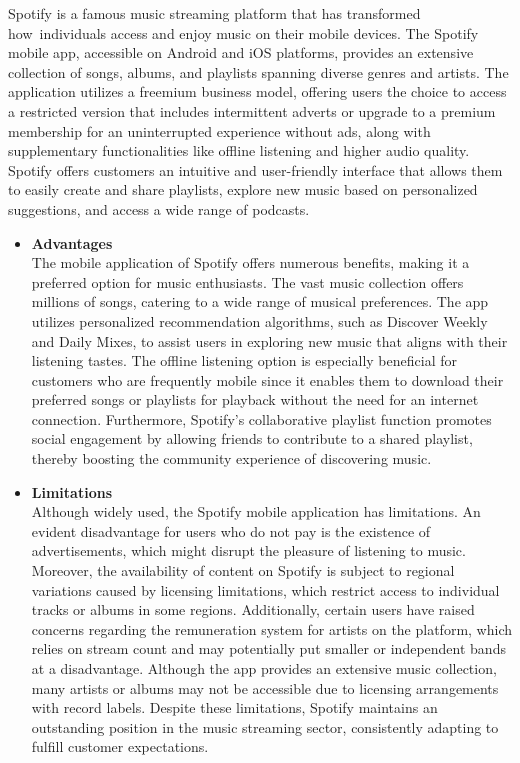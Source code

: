 Spotify is a famous music streaming platform that has transformed how individuals access and enjoy music on their mobile devices. The Spotify mobile app, accessible on Android and iOS platforms, provides an extensive collection of songs, albums, and playlists spanning diverse genres and artists. The application utilizes a freemium business model, offering users the choice to access a restricted version that includes intermittent adverts or upgrade to a premium membership for an uninterrupted experience without ads, along with supplementary functionalities like offline listening and higher audio quality. Spotify offers customers an intuitive and user-friendly interface that allows them to easily create and share playlists, explore new music based on personalized suggestions, and access a wide range of podcasts. \pagebreak
\begin{itemize}[\label{}]
    \item \textbf{Advantages} \\
    The mobile application of Spotify offers numerous benefits, making it a preferred option for music enthusiasts. The vast music collection offers millions of songs, catering to a wide range of musical preferences. The app utilizes personalized recommendation algorithms, such as Discover Weekly and Daily Mixes, to assist users in exploring new music that aligns with their listening tastes. The offline listening option is especially beneficial for customers who are frequently mobile since it enables them to download their preferred songs or playlists for playback without the need for an internet connection. Furthermore, Spotify's collaborative playlist function promotes social engagement by allowing friends to contribute to a shared playlist, thereby boosting the community experience of discovering music.
    \item \textbf{Limitations} \\
    Although widely used, the Spotify mobile application has limitations. An evident disadvantage for users who do not pay is the existence of advertisements, which might disrupt the pleasure of listening to music. Moreover, the availability of content on Spotify is subject to regional variations caused by licensing limitations, which restrict access to individual tracks or albums in some regions. Additionally, certain users have raised concerns regarding the remuneration system for artists on the platform, which relies on stream count and may potentially put smaller or independent bands at a disadvantage. Although the app provides an extensive music collection, many artists or albums may not be accessible due to licensing arrangements with record labels. Despite these limitations, Spotify maintains an outstanding position in the music streaming sector, consistently adapting to fulfill customer expectations.
\end{itemize}
\pagebreak

